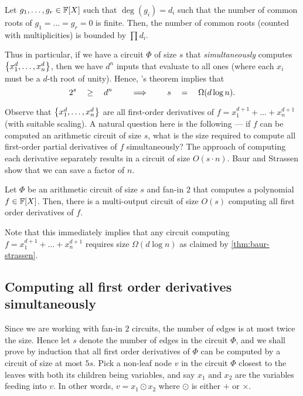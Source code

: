 \begin{theorem}
  Let $g_1,\dots, g_r \in \mathbb{F}[X]$ such that $\deg(g_i) = d_i$ such that the number of common roots of $g_1=\dots=g_r = 0$ is finite. 
Then, the number of common roots (counted with multiplicities) is bounded by $\prod d_i$.
\end{theorem}

Thus in particular, if we have a circuit $\Phi$ of size $s$ that \emph{simultaneously} computes $\left\{x_1^d, \dots,x_n^d\right\}$, then we have $d^n$ inputs that evaluate to all ones (where each $x_i$ must be  a $d$-th root of unity). 
Hence, \Bezout's theorem implies that
$$
2^s\quad \geq \quad d^n \quad \quad\implies\quad \quad s \quad = \quad \Omega(d\log n).
$$

Observe that $\left\{x_1^d,\dots, x_n^d\right\}$ are all first-order derivatives of $f = x_1^{d+1}+\dots+x_n^{d+1}$ (with suitable scaling). 
A natural question here is the following --- if $f$ can be computed an arithmetic circuit of size $s$, what is the size required to compute all first-order partial derivatives of $f$ simultaneously? 
The \naive approach of computing each derivative separately results in a circuit of size $O(s\cdot n)$. 
Baur and Strassen \cite{BS83} show that we can save a factor of $n$.

\begin{lemma}[\cite{BS83}]\label{lem:baur-strassen}
  Let $\Phi$ be an arithmetic circuit of size $s$ and fan-in $2$ that computes a polynomial $f\in \mathbb{F}[X]$. 
Then, there is a multi-output circuit  of size $O(s)$ computing all first order derivatives of $f$.
\end{lemma}

Note that this immediately implies that any circuit computing $f = x_1^{d+1} + \dots + x_n^{d+1}$ requires size $\Omega(d\log n)$ as claimed by \autoref{thm:baur-strassen}. 


\subsection{Computing all first order derivatives simultaneously}

Since we are working with fan-in $2$ circuits, the number of edges is at most twice the size. 
Hence let $s$ denote the number of edges in the circuit $\Phi$, and we shall prove by induction that all first order derivatives of $\Phi$ can be computed by a circuit of size at most $5s$. 
Pick a non-leaf node $v$ in the circuit $\Phi$ closest to the leaves with both its children being variables, and say $x_1$ and $x_2$ are the variables feeding into $v$. 
In other words, $v = x_1 \odot x_2$ where $\odot$ is either $+$ or $\times$.

